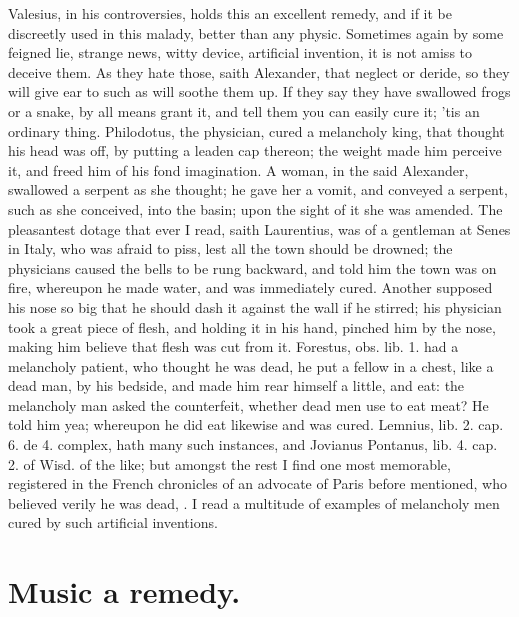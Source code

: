 {Valesius, in his controversies, holds this an excellent remedy, and if
it be discreetly used in this malady, better than any physic.
Sometimes again by some feigned lie, strange news, witty device,
artificial invention, it is not amiss to deceive them. As they
hate those, saith Alexander, that neglect or deride, so they will give
ear to such as will soothe them up. If they say they have swallowed
frogs or a snake, by all means grant it, and tell them you can easily
cure it; 'tis an ordinary thing. Philodotus, the physician, cured a
melancholy king, that thought his head was off, by putting a leaden cap
thereon; the weight made him perceive it, and freed him of his fond
imagination. A woman, in the said Alexander, swallowed a serpent as she
thought; he gave her a vomit, and conveyed a serpent, such as she
conceived, into the basin; upon the sight of it she was amended. The
pleasantest dotage that ever I read, saith Laurentius, was of a
gentleman at Senes in Italy, who was afraid to piss, lest all the town
should be drowned; the physicians caused the bells to be rung backward,
and told him the town was on fire, whereupon he made water, and was
immediately cured. Another supposed his nose so big that he should dash
it against the wall if he stirred; his physician took a great piece of
flesh, and holding it in his hand, pinched him by the nose, making him
believe that flesh was cut from it. Forestus, obs. lib. 1. had a
melancholy patient, who thought he was dead, he put a fellow in a
chest, like a dead man, by his bedside, and made him rear himself a
little, and eat: the melancholy man asked the counterfeit, whether dead
men use to eat meat? He told him yea; whereupon he did eat likewise and
was cured. Lemnius, lib. 2. cap. 6. de 4. complex, hath many such
instances, and Jovianus Pontanus, lib. 4. cap. 2. of Wisd. of the like;
but amongst the rest I find one most memorable, registered in the
French chronicles of an advocate of Paris before mentioned, who
believed verily he was dead, \etc{}. I read a multitude of examples of
melancholy men cured by such artificial inventions.

\section{Music a remedy.}

}
